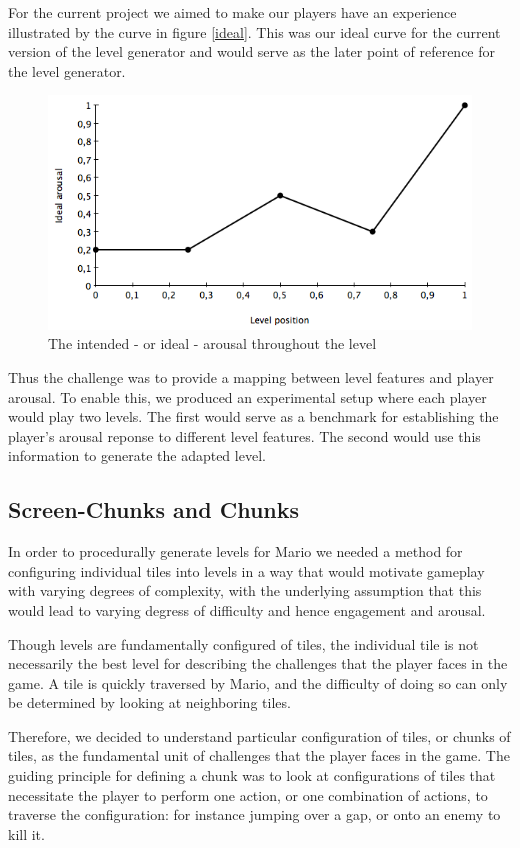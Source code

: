 \documentclass{llncs}
\begin{document}
For the current project we aimed to make our players have an experience illustrated by the curve in figure \ref{ideal}. This was our ideal curve for the current version of the level generator and would serve as the later point of reference for the level generator.
\begin{figure}
\centering
\includegraphics[scale=0.4]{idealGraph.png}
\caption{The intended - or ideal - arousal throughout the level}
\label{fig:ideal}
\end{figure}
Thus the challenge was to provide a mapping between level features and player arousal. To enable this, we produced an experimental setup where each player would play two levels. The first would serve as a benchmark for establishing the player's arousal reponse to different level features. The second would use this information to generate the adapted level.

\subsection{Screen-Chunks and Chunks}
In order to procedurally generate levels for Mario we needed a method for configuring individual tiles into levels in a way that would motivate gameplay with varying degrees of complexity, with the underlying assumption that this would lead to varying degress of difficulty and hence engagement and arousal.

Though levels are fundamentally configured of tiles, the individual tile is not necessarily the best level for describing the challenges that the player faces in the game. A tile is quickly traversed by Mario, and the difficulty of doing so can only be determined by looking at neighboring tiles.

Therefore, we decided to understand particular configuration of tiles, or chunks of tiles, as the fundamental unit of challenges that the player faces in the game. The guiding principle for defining a chunk was to look at configurations of tiles that necessitate the player to perform one action, or one combination of actions, to traverse the configuration: for instance jumping over a gap, or onto an enemy to kill it.
\end{document}
